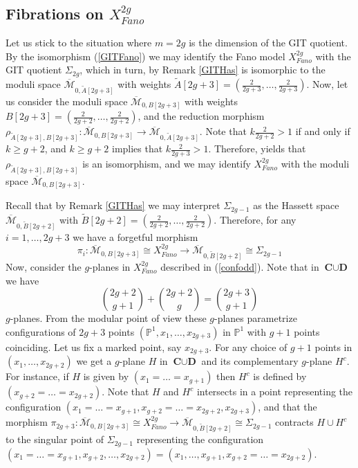 \documentclass[a4paper,10pt]{amsart}
\theoremstyle{definition}
\newcommand{\cM}{\overline{\mathcal{M}}}
\begin{document}
\subsection{Fibrations on $X_{Fano}^{2g}$}\label{fibrations}
Let us stick to the situation where $m=2g$ is the dimension of the GIT quotient. By the isomorphism (\ref{GITFano}) we may identify the Fano model $X_{Fano}^{2g}$ with the GIT quotient $\Sigma_{2g}$, which in turn, by Remark \ref{GITHas} is isomorphic to the moduli space $\cM_{0,\widetilde{A}[2g+3]}$ with weights $\widetilde{A}[2g+3] = \left(\frac{2}
{2g+3},\dots,\frac{2}{2g+3}\right)$. Now, let us consider the moduli space $\cM_{0,B[2g+3]}$ with weights $B[2g+3] = \left(\frac{2}{2g+2},\dots,\frac{2}{2g+2}\right)$, and the reduction morphism $\rho_{\widetilde{A}[2g+3],B[2g+3]}:\cM_{0,B[2g+3]}\rightarrow \cM_{0,\widetilde{A}[2g+3]}$. Note that $k\frac{2}{2g+2}>1$ if and only if $k\geq g+2$, and $k\geq g+2$ implies that $k\frac{2}{2g+3}>1$. Therefore, \cite[Corollary 4.7]{Ha} yields that $\rho_{\widetilde{A}[2g+3],B[2g+3]}$ is an isomorphism, and we may identify $X_{Fano}^{2g}$ with the moduli space $\cM_{0,B[2g+3]}$.

Recall that by Remark \ref{GITHas} we may interpret $\Sigma_{2g-1}$ as the Hassett space $\cM_{0,\widetilde{B}[2g+2]}$ with $\widetilde{B}[2g+2] = \left(\frac{2}{2g+2},\dots,\frac{2}{2g+2}\right)$. Therefore, for any $i = 1,\dots,2g+3$ we have a forgetful morphism
$$\pi_i:\cM_{0,B[2g+3]}\cong  X_{Fano}^{2g}\rightarrow \cM_{0,\widetilde{B}[2g+2]}\cong \Sigma_{2g-1}$$ 
Now, consider the $g$-planes in $X_{Fano}^{2g}$ described in (\ref{confodd}). Note that in $\textbf{C}\cup \textbf{D}$ we have 
\begin{equation}\label{numexray}
\binom{2g+2}{g+1}+\binom{2g+2}{g} = \binom{2g+3}{g+1}
\end{equation}
$g$-planes. From the modular point of view these $g$-planes parametrize configurations of $2g+3$ points $(\mathbb{P}^1,x_1,\dots,x_{2g+3})$ in $\mathbb{P}^1$ with $g+1$ points coinciding. Let us fix a marked point, say $x_{2g+3}$. For any choice of $g+1$ points in $(x_1,\dots,x_{2g+2})$ we get a $g$-plane $H$ in $\textbf{C}\cup \textbf{D}$ and its complementary $g$-plane $H^c$. For instance, if $H$ is given by $(x_1=\dots=x_{g+1})$ then $H^c$ is defined by $(x_{g+2}=\dots=x_{2g+2})$. Note that $H$ and $H^c$ intersects in a point representing the configuration $(x_1=\dots=x_{g+1},x_{g+2}=\dots=x_{2g+2},x_{2g+3})$, and that the morphism $\pi_{2g+3}:\cM_{0,B[2g+3]}\cong  X_{Fano}^{2g}\rightarrow \cM_{0,\widetilde{B}[2g+2]}\cong \Sigma_{2g-1}$ contracts $H\cup H^c$ to the singular point of $\Sigma_{2g-1}$ representing the configuration $(x_1=\dots=x_{g+1},x_{g+2},\dots,x_{2g+2})= (x_1,\dots,x_{g+1},x_{g+2}=\dots=x_{2g+2})$.  
\end{document}
